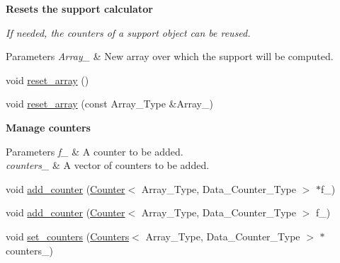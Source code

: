 \begin{Indent}\textbf{ Resets the support calculator}\par
{\em If needed, the counters of a support object can be reused.


\begin{DoxyParams}{Parameters}
{\em Array\+\_\+} & New array over which the support will be computed. \\
\hline
\end{DoxyParams}
}\begin{DoxyCompactItemize}
\item 
void \hyperlink{classbarry_1_1_support_a4f2860fd2e8e30703b91633a92ed7a58}{reset\+\_\+array} ()
\item 
void \hyperlink{classbarry_1_1_support_afb7ca8dbf350d233e677322d567dc98c}{reset\+\_\+array} (const Array\+\_\+\+Type \&Array\+\_\+)
\end{DoxyCompactItemize}
\end{Indent}
\begin{Indent}\textbf{ Manage counters}\par
{\em 
\begin{DoxyParams}{Parameters}
{\em f\+\_\+} & A counter to be added. \\
\hline
{\em counters\+\_\+} & A vector of counters to be added. \\
\hline
\end{DoxyParams}
}\begin{DoxyCompactItemize}
\item 
void \hyperlink{classbarry_1_1_support_a364df2c6295341f2801ebe0419d1d97c}{add\+\_\+counter} (\hyperlink{classbarry_1_1_counter}{Counter}$<$ Array\+\_\+\+Type, Data\+\_\+\+Counter\+\_\+\+Type $>$ $\ast$f\+\_\+)
\item 
void \hyperlink{classbarry_1_1_support_a00d511970c0bf833ef8bdd7580c670cc}{add\+\_\+counter} (\hyperlink{classbarry_1_1_counter}{Counter}$<$ Array\+\_\+\+Type, Data\+\_\+\+Counter\+\_\+\+Type $>$ f\+\_\+)
\item 
void \hyperlink{classbarry_1_1_support_aef83474cda55c4ed52e313e8ed948b08}{set\+\_\+counters} (\hyperlink{classbarry_1_1_counters}{Counters}$<$ Array\+\_\+\+Type, Data\+\_\+\+Counter\+\_\+\+Type $>$ $\ast$counters\+\_\+)
\end{DoxyCompactItemize}
\end{Indent}
